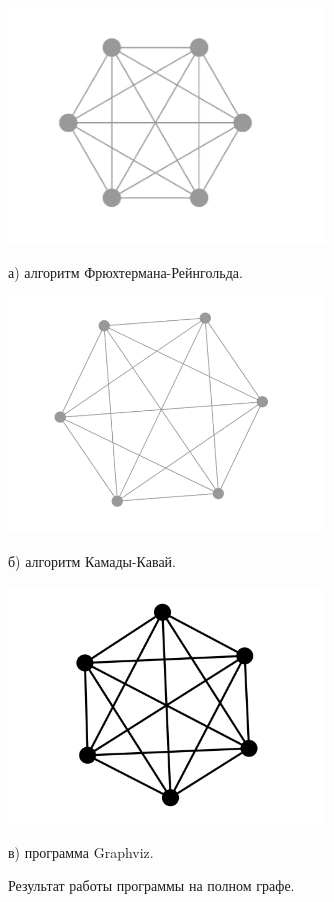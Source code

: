 \documentclass[14pt, russian]{scrartcl}
\begin{document}
\begin{figure}[H]
\centering
  \begin{minipage}[t]{.55\textwidth}
  \centering
\includegraphics[width=0.75\textwidth]{./imgs/fg_k6.png}
  \caption*{а) алгоритм Фрюхтермана-Рейнгольда.}
  \end{minipage}
  \noindent
  \begin{minipage}[t]{.50\textwidth}
  \centering
\includegraphics[width=0.75\textwidth]{./imgs/kk_k6.png}
  \caption*{б) алгоритм Камады-Кавай.}
  \end{minipage}
  \begin{minipage}[t]{.45\textwidth}
  \centering
\includegraphics[width=0.75\textwidth]{./imgs/k6_gv.png}
  \caption*{в) программа Graphviz.}
  \end{minipage}
\caption{Результат работы программы на полном графе.}
\label{fig:full_graph_res}
\end{figure}
\end{document}
